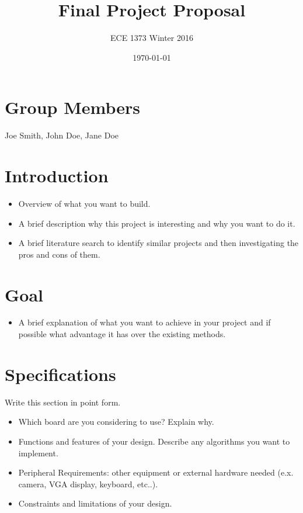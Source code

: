 \documentclass[conference,compsoc]{IEEEtran/IEEEtran}
\title{\bf Final Project Proposal}
\author{ECE 1373 Winter 2016}
\date{\today}
\begin{document}
\maketitle

\section{Group Members}
Joe Smith, John Doe, Jane Doe

\section{Introduction}
\begin{itemize}
\item Overview of what you want to build.
\item A brief description why this project is interesting and why you want to do it.
\item A brief literature search to identify similar projects and then investigating the pros and cons of them.
\end{itemize}

\section{Goal}
\begin{itemize}
\item 
A brief explanation of what you want to achieve in your project and if possible what
advantage it has over the existing methods.
\end{itemize}

\section{Specifications}
Write this section in point form.
\begin{itemize}
\item Which board are you considering to use?  Explain why.
\item Functions and features of your design.
Describe any algorithms you want to implement.
\item Peripheral Requirements: other equipment or external hardware needed (e.x. camera, VGA display, keyboard, etc..).
\item Constraints and limitations of your design.
\end{itemize}
\end{document}
